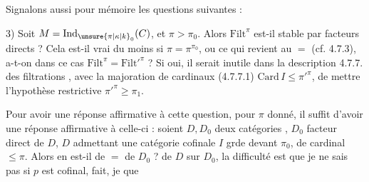 Signalons aussi pour mémoire les questions suivantes :

3) Soit $M=\mathrm{Ind}_{\unsure{\pi|\kappa|k}_0}(C)$, et $\pi>\pi_0$. Alors $\mathrm{Filt}^{\pi}$ est-il stable par facteurs directs ? Cela est-il vrai du moins si $\pi=\pi^{\pi_0}$, ou ce qui revient au $=$ (cf. 4.7.3), a-t-on dans ce cas $\mathrm{Filt}^{\pi}=\mathrm{Filt}'^{\pi}$ ? Si oui, il serait inutile dans la description 4.7.7. des filtrations , avec la majoration de cardinaux (4.7.7.1) $\mathrm{Card}\,I\leq\pi'^{\pi}$, de mettre l'hypothèse restrictive $\pi'^{\pi}\geq\pi_1$.

Pour avoir une réponse affirmative à cette question, pour $\pi$ donné, il suffit  d'avoir une réponse affirmative à celle-ci : soient $D,D_0$ deux catégories , $D_0$ facteur direct de $D$, $D$ admettant une catégorie cofinale $I$ grde devant $\pi_0$, de cardinal $\leq\pi$. Alors en est-il de $=$ de $D_0$ ?  de $D$ sur $D_0$, la difficulté est que je ne sais pas si $p$ est  cofinal,  fait, je  que

